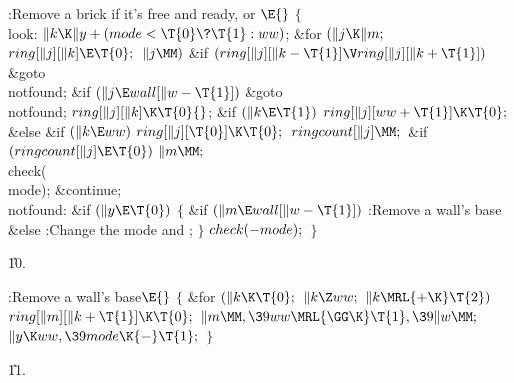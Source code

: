 \B{}:Remove a brick if it's free and ready, or \X${}\E{}$\6
${}\{{}$\1\6
\4\\{look}:\5
${}\|k\K\|y+(\\{mode}<\T{0}\?\T{1}:\\{ww}){}$;\6
\&{for} ${}(\|j\K\|m;{}$ ${}\\{ring}[\|j][\|k]\E\T{0};{}$ ${}\|j\MM){}$\1\6
\&{if} ${}(\\{ring}[\|j][\|k-\T{1}]\V\\{ring}[\|j][\|k+\T{1}]){}$\1\5
\&{goto} \\{notfound};\2\2\6
\&{if} ${}(\|j\E\\{wall}[\|w-\T{1}]){}$\1\5
\&{goto} \\{notfound};\2\6
${}\\{ring}[\|j][\|k]\K\T{0}{}$;\6
\&{if} ${}(\|k\E\T{1}){}$\1\5
${}\\{ring}[\|j][\\{ww}+\T{1}]\K\T{0};{}$\2\6
\&{else} \&{if} ${}(\|k\E\\{ww}){}$\1\5
${}\\{ring}[\|j][\T{0}]\K\T{0};{}$\2\6
${}\\{ringcount}[\|j]\MM;{}$\6
\&{if} ${}(\\{ringcount}[\|j]\E\T{0}){}$\1\5
${}\|m\MM;{}$\2\6
\\{check}(\\{mode});\5
\&{continue};\6
\4\\{notfound}:\5
\&{if} ${}(\|y\E\T{0}){}$\5
${}\{{}$\1\6
\&{if} ${}(\|m\E\\{wall}[\|w-\T{1}]){}$\1\5
:Remove a wall's base\X\2\6
\&{else}\1\5
:Change the mode and \X;\2\6
\4${}\}{}$\2\6
${}\\{check}({-}\\{mode});{}$\6
\4${}\}{}$\2\par
\U10.\fi

\B{}:Remove a wall's base\X${}\E{}$\6
${}\{{}$\1\6
\&{for} ${}(\|k\K\T{0};{}$ ${}\|k\Z\\{ww};{}$ ${}\|k\MRL{+{\K}}\T{2}){}$\1\5
${}\\{ring}[\|m][\|k+\T{1}]\K\T{0};{}$\2\6
${}\|m\MM,\39\\{ww}\MRL{{\GG}{\K}}\T{1},\39\|w\MM;{}$\6
${}\|y\K\\{ww},\39\\{mode}\K{-}\T{1};{}$\6
\4${}\}{}$\2\par
\U11.\fi

